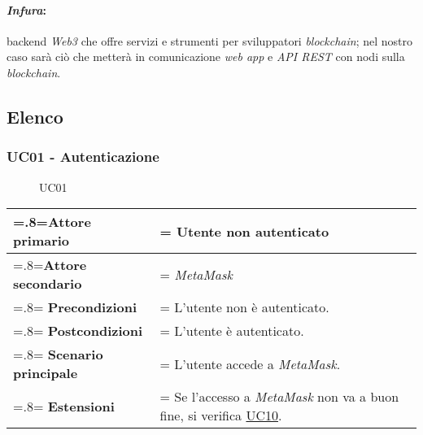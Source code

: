             \paragraph*{\textit{Infura}\glo:} backend \textit{Web3}\glo\: che offre servizi e strumenti per sviluppatori \textit{blockchain}; nel nostro caso sarà ciò che metterà in comunicazione \textit{web app} e \textit{API REST} con nodi\glo\: sulla \textit{blockchain}.

    \subsection{Elenco}

        \subsubsection{UC01 - Autenticazione}
        \label{UC01}

            \begin{figure}[H]
                \centering
                
                \caption{UC01}
            \end{figure}

            \begin{center}
                \renewcommand{\arraystretch}{1.5}
                \renewcommand\tabularxcolumn[1]{m{#1}}
                \begin{tabularx}{0.9\textwidth} {
                    >{\hsize=.8\hsize\linewidth=\hsize}X
                    >{\hsize=1.2\hsize\linewidth=\hsize}X}
                    \hline
                    \textbf{Attore primario} & Utente non autenticato \\
                    \hline
                    \textbf{Attore secondario} & \textit{MetaMask} \\
                    \hline
                    \textbf{Precondizioni} & L'utente non è autenticato. \\
                    \hline
                    \textbf{Postcondizioni} & L'utente è autenticato. \\
                    \hline
                    \textbf{Scenario principale} & L'utente accede a \textit{MetaMask}. \\
                    \hline
                    \textbf{Estensioni} & Se l'accesso a \textit{MetaMask} non va a buon fine, si verifica \hyperref[UC10]{UC10}. \\
                    \hline
                \end{tabularx}
            \end{center}

